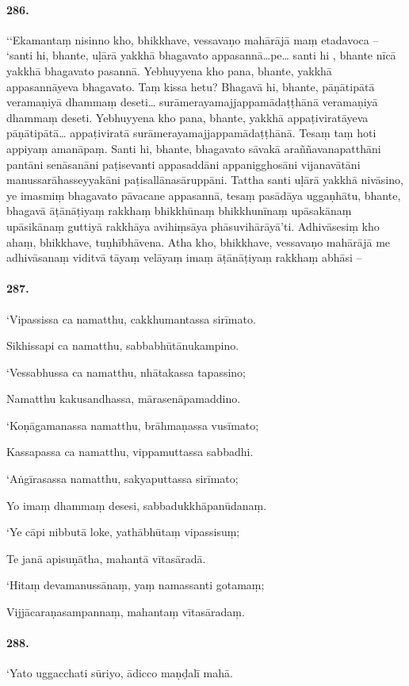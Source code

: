 \paragraph{286.} ‘‘Ekamantaṃ nisinno kho, bhikkhave, vessavaṇo mahārājā maṃ etadavoca – ‘santi hi, bhante, uḷārā yakkhā bhagavato appasannā…pe… santi hi , bhante nīcā yakkhā bhagavato pasannā. Yebhuyyena kho pana, bhante, yakkhā appasannāyeva bhagavato. Taṃ kissa hetu? Bhagavā hi, bhante, pāṇātipātā veramaṇiyā dhammaṃ deseti… surāmerayamajjappamādaṭṭhānā veramaṇiyā dhammaṃ deseti. Yebhuyyena kho pana, bhante, yakkhā appaṭiviratāyeva pāṇātipātā… appaṭiviratā surāmerayamajjappamādaṭṭhānā. Tesaṃ taṃ hoti appiyaṃ amanāpaṃ. Santi hi, bhante, bhagavato sāvakā araññavanapatthāni pantāni senāsanāni paṭisevanti appasaddāni appanigghosāni vijanavātāni manussarāhasseyyakāni paṭisallānasāruppāni. Tattha santi uḷārā yakkhā nivāsino, ye imasmiṃ bhagavato pāvacane appasannā, tesaṃ pasādāya uggaṇhātu, bhante, bhagavā āṭānāṭiyaṃ rakkhaṃ bhikkhūnaṃ bhikkhunīnaṃ upāsakānaṃ upāsikānaṃ guttiyā rakkhāya avihiṃsāya phāsuvihārāyā’ti. Adhivāsesiṃ kho ahaṃ, bhikkhave, tuṇhībhāvena. Atha kho, bhikkhave, vessavaṇo mahārājā me adhivāsanaṃ viditvā tāyaṃ velāyaṃ imaṃ āṭānāṭiyaṃ rakkhaṃ abhāsi –

\paragraph{287.} ‘Vipassissa ca namatthu, cakkhumantassa sirīmato.

Sikhissapi ca namatthu, sabbabhūtānukampino.

‘Vessabhussa ca namatthu, nhātakassa tapassino;

Namatthu kakusandhassa, mārasenāpamaddino.

‘Koṇāgamanassa namatthu, brāhmaṇassa vusīmato;

Kassapassa ca namatthu, vippamuttassa sabbadhi.

‘Aṅgīrasassa namatthu, sakyaputtassa sirīmato;

Yo imaṃ dhammaṃ desesi, sabbadukkhāpanūdanaṃ.

‘Ye cāpi nibbutā loke, yathābhūtaṃ vipassisuṃ;

Te janā apisuṇātha, mahantā vītasāradā.

‘Hitaṃ devamanussānaṃ, yaṃ namassanti gotamaṃ;

Vijjācaraṇasampannaṃ, mahantaṃ vītasāradaṃ.

\paragraph{288.} ‘Yato uggacchati sūriyo, ādicco maṇḍalī mahā.

